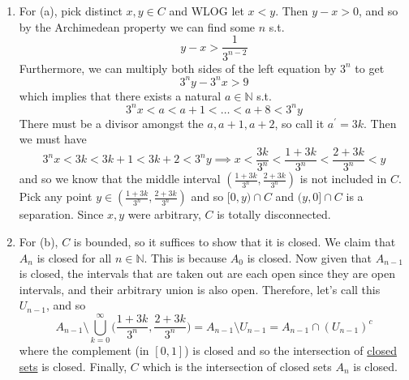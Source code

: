   \begin{solution}
    \begin{enumerate}
      \item For (a), pick distinct $x, y \in C$ and WLOG let $x < y$. Then $y - x > 0$, and so by the Archimedean property we can find some $n$ s.t. 
      \begin{equation}
        y - x > \frac{1}{3^{n-2}} 
      \end{equation} 
      Furthermore, we can multiply both sides of the left equation by $3^n$ to get 
      \begin{equation}
        3^n y - 3^n x > 9
      \end{equation}
      which implies that there exists a natural $a \in \mathbb{N}$ s.t. 
      \begin{equation}
        3^n x < a < a + 1 < \ldots < a + 8 < 3^n y 
      \end{equation}
      There must be a divisor amongst the $a, a + 1, a + 2$, so call it $a^\prime = 3k$. Then we must have 
      \begin{equation}
        3^n x < 3k < 3k + 1 < 3k + 2 < 3^n y \implies x < \frac{3k}{3^n} < \frac{1 + 3k}{3^n} < \frac{2 + 3k}{3^n} < y
      \end{equation} 
      and so we know that the middle interval $(\frac{1 + 3k}{3^n}, \frac{2 + 3k}{3^n})$ is not included in $C$. Pick any point $y \in (\frac{1 + 3k}{3^n}, \frac{2 + 3k}{3^n})$ and so $[0, y) \cap C$ and $(y, 0] \cap C$ is a separation. Since $x, y$ were arbitrary, $C$ is totally disconnected. 

      \item For (b), $C$ is bounded, so it suffices to show that it is closed. We claim that $A_n$ is closed for all $n \in \mathbb{N}$. This is because $A_0$ is closed. Now given that $A_{n-1}$ is closed, the intervals that are taken out are each open since they are open intervals, and their arbitrary union is also open. Therefore, let's call this $U_{n-1}$, and so 
      \begin{equation}
        A_{n-1} \setminus \bigcup_{k=0}^\infty \bigg( \frac{1 + 3k}{3^n}, \frac{2 + 3k}{3^n} \bigg) = A_{n-1} \setminus U_{n-1} = A_{n-1} \cap (U_{n-1})^c 
      \end{equation} 
      where the complement (in $[0, 1]$) is closed and so the intersection of \hyperref[def:closed]{closed sets} is closed. Finally, $C$ which is the intersection of closed sets $A_n$ is closed. 


\end{enumerate}
\end{solution}
